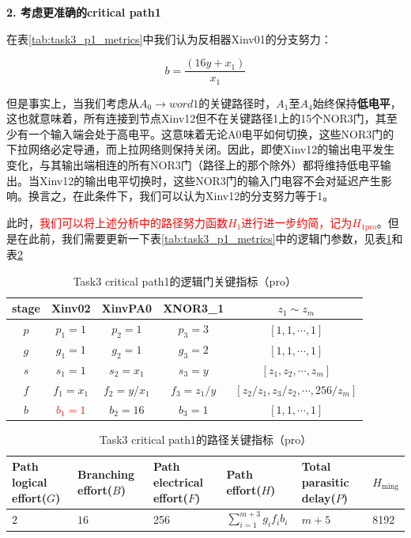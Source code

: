 \documentclass[UTF8,12pt,a4paper]{ctexart}
\begin{document}
\textbf{2. 考虑更准确的critical path1}

在表\ref{tab:task3_p1_metrics}中我们认为反相器Xinv01的分支努力：

$$b = \frac{(16y+x_1)}{x_1}$$

但是事实上，当我们考虑从$A_0 \rightarrow word1$的关键路径时，$A_1$至$A_4$始终保持\textbf{低电平}，这也就意味着，所有连接到节点Xinv12但不在关键路径1上的15个NOR3门，其至少有一个输入端会处于高电平。这意味着无论A0电平如何切换，这些NOR3门的下拉网络必定导通，而上拉网络则保持关闭。因此，即使Xinv12的输出电平发生变化，与其输出端相连的所有NOR3门（路径上的那个除外）都将维持低电平输出。当Xinv12的输出电平切换时，这些NOR3门的输入门电容不会对延迟产生影响。换言之，在此条件下，我们可以认为Xinv12的分支努力等于1。

此时，\textcolor{red}{我们可以将上述分析中的路径努力函数$H_1$进行进一步约简，记为$H_{\text{1pro}}$}。但是在此前，我们需要更新一下表\ref{tab:task3_p1_metrics}中的逻辑门参数，见表\ref{tab:task3_p1_pro_metrics}和表\ref{tab:task3_p1_pro_path_metrics}


\begin{table}[htbp]
    \centering
    \caption{Task3 critical path1的逻辑门关键指标（pro）}
    \label{tab:task3_p1_pro_metrics}
    \begin{tabular}{ccccc}
    \toprule
    stage & Xinv02 & XinvPA0 & XNOR3\_1 & $z_1 \sim z_m$ \\
    \midrule
    $p$ & $p_1 = 1$ & $p_2 = 1$ & $p_3 = 3$ & $[1,1,\cdots ,1]$ \\
    $g$ & $g_1 = 1$ & $g_2 = 1$ & $g_3 = 2$ & $[1,1,\cdots ,1]$ \\
    $s$ & $s_1 = 1$ & $s_2 = x_1$ & $s_3 = y$ & $[z_1, z_2, \cdots, z_m]$ \\
    $f$ & $f_1 = x_1$ & $f_2 = y/x_1$ & $f_3 = z_{1}/y$ & $[z_{2}/z_{1}, z_{3}/z_{2}, \cdots, 256/z_{m}]$ \\
    $b$ & \textcolor{red}{$b_1 = 1$} & $b_2 = 16$ & $b_3 = 1$ & $[1,1,\cdots ,1]$ \\
    \bottomrule
    \end{tabular}
\end{table}


\begin{table}[htbp]
    \centering
    \caption{Task3 critical path1的路径关键指标（pro）}
    \label{tab:task3_p1_pro_path_metrics}
    \begin{tabularx}{\linewidth}{XXXXXX}
    \toprule
    Path logical effort($G$) & Branching effort($B$) &
    Path electrical effort($F$) & Path effort($H$) &
    Total parasitic delay($P$) & $H_{\text{ming}}$\\
    \midrule
    $2$ & $16$ & 256 & $\sum_{i=1}^{m+3}{g_i f_i b_i}$ & $m+5$ & 8192 \\
    \bottomrule
    \end{tabularx}
\end{table}
\end{document}
